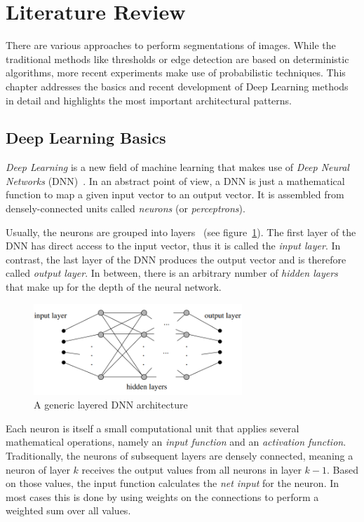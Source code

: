 \section{Literature Review}
There are various approaches to perform segmentations of images. While the traditional methods like thresholds or edge detection are based on deterministic algorithms, more recent experiments make use of probabilistic techniques. This chapter addresses the basics and recent development of Deep Learning methods in detail and highlights the most important architectural patterns.

\subsection{Deep Learning Basics}
\emph{Deep Learning} is a new field of machine learning that makes use of \emph{Deep Neural Networks} (DNN)~\cite[pp.~125f]{nn_intro96}. In an abstract point of view, a DNN is just a mathematical function to map a given input vector to an output vector. It is assembled from densely-connected units called \emph{neurons} (or \emph{perceptrons}).

Usually, the neurons are grouped into layers~\cite[p.~125]{nn_intro96} (see figure~\ref{fig:layered_architecture}). The first layer of the DNN has direct access to the input vector, thus it is called the \emph{input layer}. In contrast, the last layer of the DNN produces the output vector and is therefore called \emph{output layer}. In between, there is an arbitrary number of \emph{hidden layers} that make up for the depth of the neural network.

\begin{figure}[h]
    \centering
    \includegraphics[width=0.7\textwidth]{images/generic_layered_architecture}
    \caption{A generic layered DNN architecture~\cite[p.~126]{nn_intro96}}
    \label{fig:layered_architecture}
\end{figure}

Each neuron is itself a small computational unit that applies several mathematical operations, namely an \emph{input function} and an \emph{activation function}. Traditionally, the neurons of subsequent layers are densely connected, meaning a neuron of layer $k$ receives the output values from all neurons in layer $k-1$. Based on those values, the input function calculates the \emph{net input} for the neuron. In most cases this is done by using weights on the connections to perform a weighted sum over all values.

